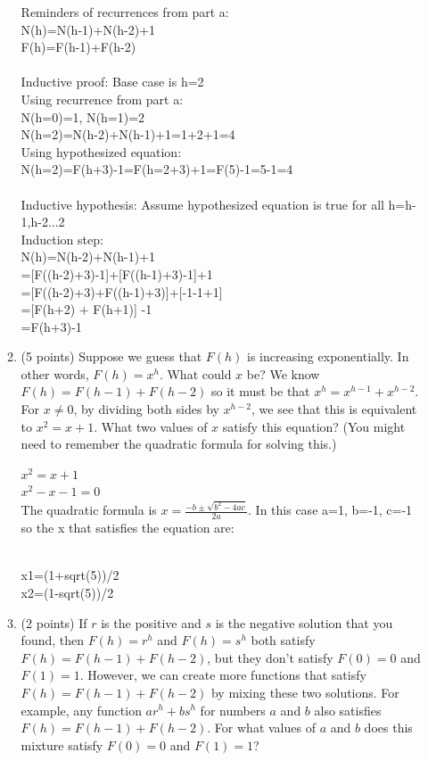 \documentclass[11pt,table]{article}
\begin{document}
\begin{enumerate}
\begin{enumerate}
Reminders of recurrences from part a:
\\N(h)=N(h-1)+N(h-2)+1
\\F(h)=F(h-1)+F(h-2)
\\
\\Inductive proof: Base case is h=2
\\Using recurrence from part a:
\\N(h=0)=1, N(h=1)=2
\\N(h=2)=N(h-2)+N(h-1)+1=1+2+1=4
\\Using hypothesized equation:
\\N(h=2)=F(h+3)-1=F(h=2+3)+1=F(5)-1=5-1=4
\\
\\Inductive hypothesis: Assume hypothesized equation is true for all h=h-1,h-2...2
\\Induction step:
\\N(h)=N(h-2)+N(h-1)+1
\\=[F((h-2)+3)-1]+[F((h-1)+3)-1]+1
\\=[F((h-2)+3)+F((h-1)+3)]+[-1-1+1]
\\=[F(h+2) + F(h+1)] -1
\\=F(h+3)-1
\\

\item (5 points)
Suppose we guess that $F(h)$ is increasing exponentially.
In other words, $F(h) = x^h$.
What could $x$ be?
We know $F(h) = F(h-1)+F(h-2)$ so it must be that
$x^h = x^{h-1} + x^{h-2}$.
For $x \neq 0$, by dividing both sides by $x^{h-2}$, we see that this is equivalent to $x^2 = x + 1$.
What two values of $x$ satisfy this equation? (You might need to remember the quadratic formula for solving this.)

\hrulefill

$x^2 = x + 1$
\\$x^2-x-1 = 0$
\\The quadratic formula is $x=\frac{-b\pm\sqrt{b^2-4ac}}{2a}$. 
In this case a=1, b=-1, c=-1 
\\so the x that satisfies the equation are:

\\x1=(1+sqrt(5))/2
\\x2=(1-sqrt(5))/2
\\

\item (2 points)
If $r$ is the positive and $s$ is the negative solution that you found,
then $F(h) = r^h$ and $F(h)= s^h$ both satisfy $F(h)=F(h-1)+F(h-2)$, but they don't satisfy $F(0)=0$ and $F(1)=1$.
However, we can create more functions that satisfy $F(h)=F(h-1)+F(h-2)$ by mixing these two solutions. For example, any function $a r^h + b s^h$ for numbers $a$ and $b$ also satisfies $F(h)=F(h-1)+F(h-2)$.
For what values of $a$ and $b$ does this mixture satisfy $F(0)=0$ and $F(1)=1$?


\end{enumerate}
\end{enumerate}
\end{document}
